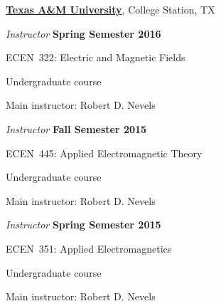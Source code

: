 \documentclass[10pt]{article}
\newcommand{\halfblankline}{\quad\vspace{-0.5\baselineskip}\pagebreak[3]}
\begin{document}
\href{http://www.tamu.edu/}{\textbf{Texas A\&M University}},
College Station, TX
\begin{outerlist}
\item[] \textit{Instructor} \hfill \textbf{Spring Semester 2016}
    \begin{innerlist}
        \item ECEN~322: Electric and Magnetic Fields
        \begin{innerlist}
            \item[] Undergraduate course
            \item[] Main instructor: Robert D. Nevels
        \end{innerlist}
    \end{innerlist}

\item[] \textit{Instructor} \hfill \textbf{Fall Semester 2015}
    \begin{innerlist}
        \item ECEN~445: Applied Electromagnetic Theory
        \begin{innerlist}
            \item[] Undergraduate course
            \item[] Main instructor: Robert D. Nevels
        \end{innerlist}
    \end{innerlist}

\item[] \textit{Instructor} \hfill \textbf{Spring Semester 2015}
    \begin{innerlist}
        \item ECEN~351: Applied Electromagnetics
        \begin{innerlist}
            \item[] Undergraduate course
            \item[] Main instructor: Robert D. Nevels
        \end{innerlist}
    \end{innerlist}

\end{outerlist}

\halfblankline
\end{document}
